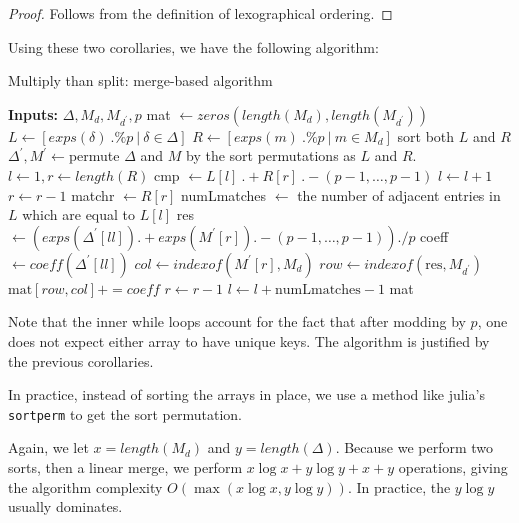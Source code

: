 \begin{proof}
	Follows from the definition of lexographical
	ordering.
\end{proof}

Using these two corollaries, we have the following algorithm:

\begin{algorithm}[H]
\caption{Multiply than split: merge-based algorithm}
\label{alg:theta:merge}
\begin{algorithmic}[1]
\State \textbf{Inputs:} \(\Delta, M_{d}, M_{d^{\prime}}, p\)
\State mat \(\gets zeros(length(M_{d}), length(M_{d^{\prime}}))\) 
\State $L \gets [exps(\delta) ~.\% p ~|~ \delta \in \Delta]$
\State $R \gets [exps(m) ~.\% p ~|~ m \in M_{d}]$
\State sort both  \(L\) and \(R\) 
\State \(\Delta^{\prime}, M^{\prime} \gets \)permute \(\Delta\) and \(M\) by the sort permutations as \(L\) and \(R\).
\State \(l \gets 1, r \gets length(R)\)
	\State cmp \(\gets L[l] ~.+ R[r] ~.- (p-1, \ldots, p-1)\) 
	    \State \(l \gets l + 1\) 
	    \State \(r \gets r - 1\)
        \State matchr \(\gets R[r]\) 
        \State numLmatches \(\gets\) the number of adjacent entries in \(L\) which are equal to \(L[l]\) 
                \State res \(\gets (exps(\Delta^{\prime}[ll]) .+ exps(M^{\prime}[r]) .- (p-1, \ldots, p-1)) ./ p\) 
                \State coeff \(\gets coeff(\Delta^{\prime}[ll])\)
                \State \(col \gets indexof(M^{\prime}[r],M_{d})\)
                \State \(row \gets indexof(\text{res},M_{d^{\prime}})\)
                \State \(\text{mat}[row,col] += coeff\) 
            \EndFor
            \State \(r \gets r - 1\)
        \EndWhile     
        \State \(l \gets l + \text{numLmatches} - 1\) 
    \EndIf
\EndWhile
\State \Return mat
\end{algorithmic}
\end{algorithm}

Note that the inner while loops account for the fact that
after modding by \(p\), one does not expect 
either array to have unique keys.
The algorithm is justified by the previous corollaries.

In practice, instead of sorting the arrays in place, 
we use a method like julia's \texttt{sortperm}
to get the sort permutation.

Again, we let $x = length(M_d)$ and $y = length(\Delta)$.
Because we perform two sorts, then a linear merge, we perform $x \log x + y \log y + x + y$ operations, 
giving the algorithm complexity $O(\max(x \log x, y \log y))$.
In practice, the $y \log y$ usually dominates.

